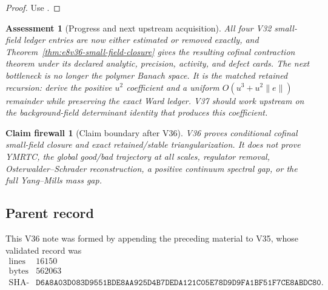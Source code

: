 \documentclass[11pt,oneside]{book}
\newtheorem{assessment}[theorem]{Assessment}
\newtheorem{firewall}[theorem]{Claim firewall}
\theoremstyle{definition}
\theoremstyle{remark}
\begin{document}
\begin{proof}
Use
.
\end{proof}

\begin{assessment}[Progress and next upstream acquisition]
\label{ass:e8v36-status}
All four V32 small-field ledger entries are now either estimated or
removed exactly, and
Theorem~\ref{thm:e8v36-small-field-closure} gives the resulting
cofinal contraction theorem under its declared analytic, precision,
activity, and defect cards.  The next bottleneck is no longer the
polymer Banach space.  It is the matched retained recursion: derive
the positive \(u^2\) coefficient and a uniform
\(O(u^3+u^2\|e\|)\)
remainder while preserving the exact Ward ledger.  V37 should work
upstream on the background-field determinant identity that produces
this coefficient.
\end{assessment}

\begin{firewall}[Claim boundary after V36]
\label{fire:e8v36-claim}
V36 proves conditional cofinal small-field closure and exact
retained/stable triangularization.  It does not prove YMRTC, the
global good/bad trajectory at all scales, regulator removal,
Osterwalder--Schrader reconstruction, a positive continuum spectral
gap, or the full Yang--Mills mass gap.
\end{firewall}

\subsection{Parent record}

This V36 note was formed by appending the preceding material to V35,
whose validated record was
\[
\begin{array}{c|c}
\text{lines}&16150\\
\text{bytes}&562063\\
\text{SHA-256}&
\texttt{D6A8A03D083D9551BDE8AA925D4B7DEDA121C05E78D9D9FA1BF51F7CE8ABDC80}.
\end{array}
\]


\end{document}
